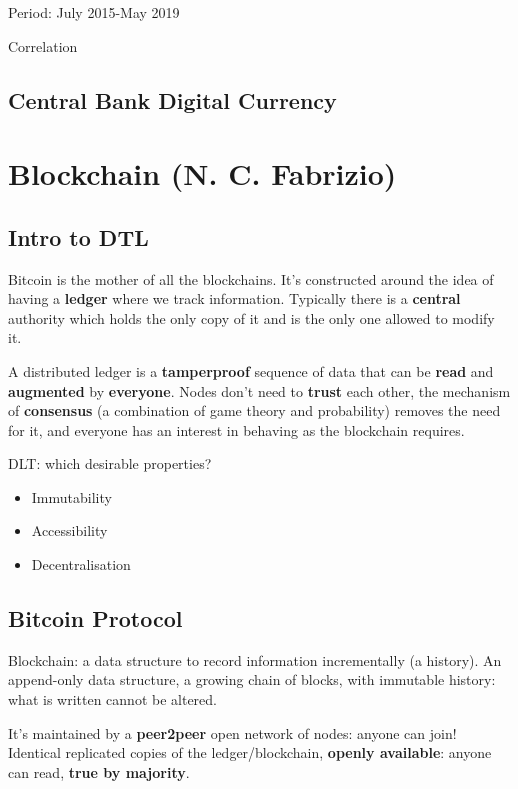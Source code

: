 Period: July 2015-May 2019


Correlation


\section{Central Bank Digital Currency}

{}

\chapter{Blockchain (N. C. Fabrizio)}
\section{Intro to DTL}

Bitcoin is the mother of all the blockchains. It's constructed around the idea of having a \textbf{ledger} where we track information. Typically there is a \textbf{central} authority which holds the only copy of it and is the only one allowed to modify it.

A distributed ledger is a \textbf{tamperproof} sequence of data that can be \textbf{read} and \textbf{augmented} by \textbf{everyone}. Nodes don't need to \textbf{trust} each other, the mechanism of \textbf{consensus} (a combination of game theory and probability) removes the need for it, and everyone has an interest in behaving as the blockchain requires. 

DLT: which desirable properties?
\begin{itemize}
	\item Immutability
	\item Accessibility
	\item Decentralisation
\end{itemize}
\section{Bitcoin Protocol}

Blockchain: a data structure to record information incrementally (a history). An append-only data structure, a growing chain of blocks, with immutable history: what is written cannot be altered.

It's maintained by a \textbf{peer2peer} open network of nodes: anyone can join! Identical replicated copies of the ledger/blockchain, \textbf{openly available}: anyone can read, \textbf{true by majority}.

